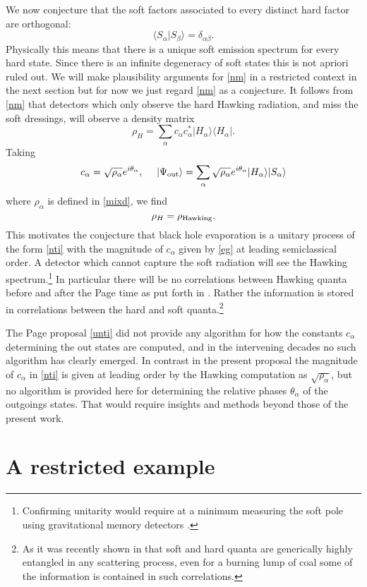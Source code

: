 \documentclass[12pt]{article}
\numberwithin{equation}{section}
\def\<{\langle }
\def\>{\rangle }
\newcommand{\be}{\begin{equation}}
\newcommand{\ee}{\end{equation}}
\begin{document}
We now conjecture  that the soft factors associated to every distinct hard factor are orthogonal:
\be\label{nm} \<S_\alpha|S_\beta\>=\delta_{\alpha\beta}.\ee
Physically this means that there is a unique soft emission spectrum for every hard state. Since there is an infinite degeneracy of soft states this is not apriori ruled out. We will make plausibility arguments  for \eqref{nm} in a restricted context in the next section but for now we just regard \eqref{nm} as a conjecture. 
It follows from \eqref{nm} that detectors which only observe the hard Hawking radiation, and miss the soft dressings, will observe a density matrix
\be \rho_H =\sum_\alpha c_\alpha  c_\alpha ^*|H_\alpha \>\< H_\alpha  |.\ee
Taking 
\be \label{eg} c_\alpha =\sqrt{\rho_\alpha }e^{i\theta_\alpha }, ~~~~  |\Psi_{\rm out} \> = \sum_\alpha \sqrt{\rho_\alpha }e^{i\theta_\alpha } |H_\alpha\>|S_\alpha\>\ee
where $\rho_\alpha $ is defined  in \eqref{mixd}, we find 
\be \rho_H=\rho_{\rm Hawking}.\ee
This motivates the conjecture that black hole evaporation is a unitary process
of the form \eqref{nti} with the magnitude of $c_\alpha $ given by \eqref{eg} at leading semiclassical order. A detector which cannot capture  the soft radiation will see  the Hawking spectrum.\footnote{Confirming  unitarity would require at a minimum  measuring the  soft pole using  gravitational memory detectors \cite{Strominger:2014pwa}.} In particular there will be no correlations between Hawking quanta 
before and after the Page time as put forth in \cite{Page:1979tc}. Rather the information is stored in correlations between the hard and soft quanta.\footnote{ As it was recently shown in \cite{Carney:2017jut} that soft and hard quanta are generically highly entangled in any  scattering process, even for a  burning lump of coal some of the information is contained in such correlations. }

The Page proposal \eqref{unti} did not provide any algorithm for how the constants 
$c_\alpha$ determining the out states are computed, and in the intervening decades no such algorithm  has clearly emerged. In contrast in the present proposal  the magnitude of $c_\alpha$ in \eqref{nti} is given at leading order by the Hawking computation as $\sqrt{\rho_\alpha}$, but no algorithm is provided here for determining the relative phases $\theta_\alpha $ of the outgoings states. That would require insights and methods beyond those of the present work. 



\section{A restricted example}
\end{document}
